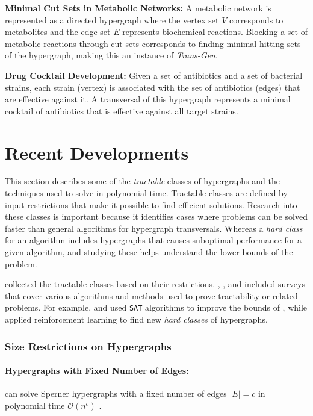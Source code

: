 \textbf{Minimal Cut Sets in Metabolic Networks:} A metabolic network is represented as a directed hypergraph where the vertex set $V$ corresponds to metabolites and the edge set $E$ represents biochemical reactions. Blocking a set of metabolic reactions through cut sets corresponds to finding minimal hitting sets of the hypergraph, making this an instance of \emph{Trans-Gen}.

\textbf{Drug Cocktail Development:} Given a set of antibiotics and a set of bacterial strains, each strain (vertex) is associated with the set of antibiotics (edges) that are effective against it. A transversal of this hypergraph represents a minimal cocktail of antibiotics that is effective against all target strains.

\section{Recent Developments}

This section describes some of the \emph{tractable} classes of hypergraphs and the techniques used to solve \TransHyp{} in polynomial time. Tractable classes are defined by input restrictions that make it possible to find efficient solutions. Research into these classes is important because it identifies cases where problems can be solved faster than general algorithms for hypergraph transversals. Whereas a \emph{hard class} for an algorithm includes hypergraphs that causes suboptimal performance for a given algorithm, and studying these helps understand the lower bounds of the problem.

\cite{Hag08} collected the tractable classes based on their restrictions. \cite{EMG08}, \cite{GDVL17}, and \cite{DNU21} included surveys that cover various algorithms and methods used to prove tractability or related problems. For example, \cite{MZ11} and \cite{Her04} used \texttt{SAT} algorithms to improve the bounds of \FKA, while \cite{SS24} applied reinforcement learning to find new \emph{hard classes} of hypergraphs.

\subsubsection*{Size Restrictions on Hypergraphs}

\paragraph{Hypergraphs with Fixed Number of Edges:} \TransHyp{} can solve Sperner hypergraphs with a fixed number of edges $|E|=c$ in polynomial time $\mathcal{O}(n^c)$ \cite{EG02}.

